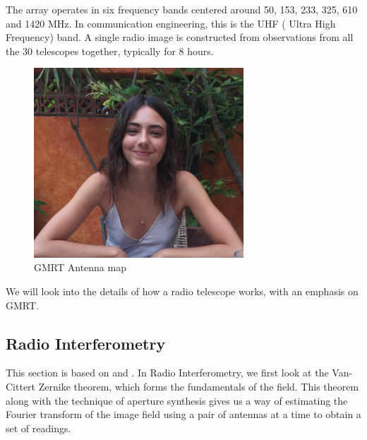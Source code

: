 The array operates in six frequency bands centered around 50, 153, 233, 325, 610 and 1420 MHz. In communication engineering,
this is the UHF ( Ultra High Frequency) band.
A single radio image is constructed from observations from all the $30$ telescopes together, typically for $8$ hours.

\begin{figure}[h]
	\centering \vspace{-0.1in}
	\includegraphics[width=0.7\textwidth]{images/gmrt.png}	
	\vspace{-20pt} \caption[GMRT antenna map]{\small GMRT Antenna map \footnotemark}
	\label{fig:iparch1}
\end{figure}

 We will look into the details of how a radio telescope works, with an emphasis on GMRT. 

 
\subsection{Radio Interferometry}
This section is based on \cite{ncra_book} and \cite{kedar_report}.
In Radio Interferometry, we first look at the Van-Cittert Zernike theorem, which forms the fundamentals of the field. This theorem along with the technique of aperture synthesis gives us a way of estimating the Fourier transform of the image field using a pair of antennas at a time to obtain a set of readings.



